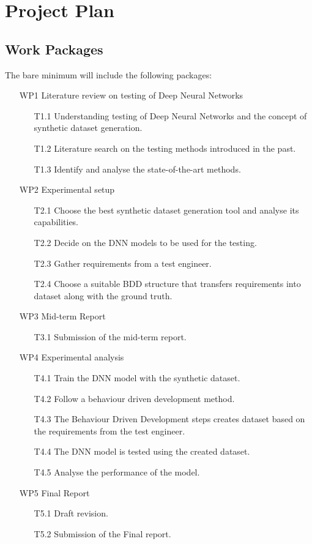 \documentclass[rnd]{mas_proposal}
\begin{document}
\section{Project Plan}

\subsection{Work Packages}
The bare minimum will include the following packages:
\begin{enumerate}
    \item[WP1] Literature review on testing of Deep Neural Networks
    \begin{itemize}
        \item[T1.1] Understanding testing of Deep Neural Networks and the concept of synthetic dataset generation.
        \item[T1.2] Literature search on the testing methods introduced in the past.
        \item[T1.3] Identify and analyse the state-of-the-art methods.
    \end{itemize}
    \item[WP2] Experimental setup
    \begin{itemize}
        \item[T2.1] Choose the best synthetic dataset generation tool and analyse its capabilities.
        \item[T2.2] Decide on the DNN models to be used for the testing.
        \item[T2.3] Gather requirements from a test engineer.
        \item[T2.4] Choose a suitable BDD structure that transfers requirements into dataset along with the ground truth.
    \end{itemize}
    \item[WP3] Mid-term Report
    \begin{itemize}
        \item[T3.1] Submission of the mid-term report.
    \end{itemize}
    \item[WP4] Experimental analysis
    \begin{itemize}
        \item[T4.1] Train the DNN model with the synthetic dataset.
        \item[T4.2] Follow a behaviour driven development method.
        \item[T4.3] The Behaviour Driven Development steps creates dataset based on the requirements from the test engineer.
        \item[T4.4] The DNN model is tested using the created dataset.
        \item[T4.5] Analyse the performance of the model.
    \end{itemize}
    \item[WP5] Final Report
    \begin{itemize}
        \item[T5.1] Draft revision.
        \item[T5.2] Submission of the Final report.
    \end{itemize}
    

\end{enumerate}
\end{document}
